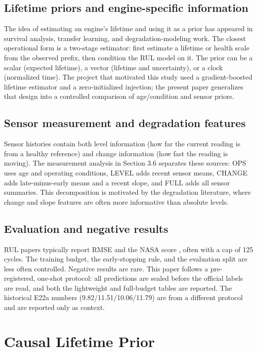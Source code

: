\documentclass[journal]{IEEEtran}
\begin{document}
\subsection{Lifetime priors and engine-specific information}
The idea of estimating an engine's lifetime and using it as a prior has appeared in survival analysis, transfer learning, and degradation-modeling work. The closest operational form is a two-stage estimator: first estimate a lifetime or health scale from the observed prefix, then condition the RUL model on it. The prior can be a scalar (expected lifetime), a vector (lifetime and uncertainty), or a clock (normalized time). The project that motivated this study used a gradient-boosted lifetime estimator and a zero-initialized injection; the present paper generalizes that design into a controlled comparison of age/condition and sensor priors.

\subsection{Sensor measurement and degradation features}
Sensor histories contain both level information (how far the current reading is from a healthy reference) and change information (how fast the reading is moving). The measurement analysis in Section 3.6 separates these sources: OPS uses age and operating conditions, LEVEL adds recent sensor means, CHANGE adds late-minus-early means and a recent slope, and FULL adds all sensor summaries. This decomposition is motivated by the degradation literature, where change and slope features are often more informative than absolute levels.

\subsection{Evaluation and negative results}
RUL papers typically report RMSE and the NASA score \cite{ref2}, often with a cap of 125 cycles. The training budget, the early-stopping rule, and the evaluation split are less often controlled. Negative results are rare. This paper follows a pre-registered, one-shot protocol: all predictions are sealed before the official labels are read, and both the lightweight and full-budget tables are reported. The historical E22a numbers (9.82/11.51/10.06/11.79) are from a different protocol and are reported only as context.

\section{Causal Lifetime Prior}
\end{document}
